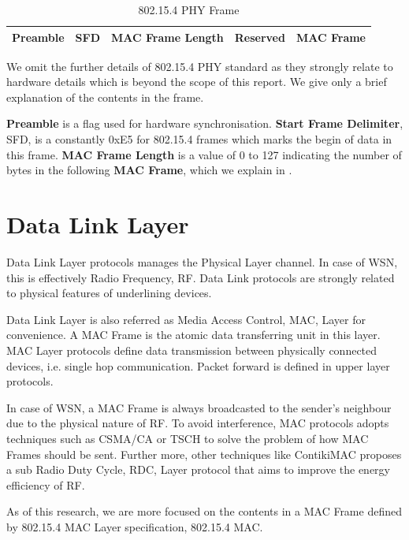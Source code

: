 \begin{table}[h!]
	\centering
	\begin{tabular}{|c|c|c|c|c|}
		\hline
		Preamble & SFD & MAC Frame Length & Reserved & MAC Frame\\ \hline
	\end{tabular}
	\caption{802.15.4 PHY Frame}
	\label{Fig: 802.15.4 PHY Frame}
\end{table}

We omit the further details of 802.15.4 PHY standard as they strongly relate to hardware details which is beyond the scope of this report. We give only a brief explanation of the contents in the frame.

\textbf{Preamble} is a flag used for hardware synchronisation. \textbf{Start Frame Delimiter}, SFD, is a constantly 0xE5 for 802.15.4 frames which marks the begin of data in this frame. \textbf{MAC Frame Length} is a value of 0 to 127 indicating the number of bytes in the following \textbf{MAC Frame}, which we explain in .

\section{Data Link Layer} \label{Sec: Data Link Layer}
Data Link Layer protocols manages the Physical Layer channel. In case of WSN, this is effectively Radio Frequency, RF. Data Link protocols are strongly related to physical features of underlining devices. 

Data Link Layer is  also referred as Media Access Control, MAC, Layer for convenience. A MAC Frame is the atomic data transferring unit in this layer. MAC Layer protocols define data transmission between physically connected devices, i.e. single hop communication. Packet forward is defined in upper layer protocols.

In case of WSN, a MAC Frame is always broadcasted to the sender’s neighbour due to the physical nature of RF. To avoid interference, MAC protocols adopts  techniques such as CSMA/CA \cite{802154} or TSCH\cite{TSCH} to solve the problem of how MAC Frames should be sent. Further more, other techniques like ContikiMAC\cite{ContikiMAC} proposes a sub Radio Duty Cycle, RDC, Layer protocol that aims to improve the energy efficiency of RF.

As of this research, we are more focused on the contents in a MAC Frame defined by 802.15.4 MAC Layer specification\cite{802154}, 802.15.4 MAC.

